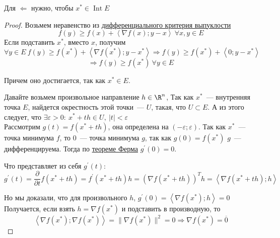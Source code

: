 

\begin{remark}
  Для $\Leftarrow$ нужно, чтобы $x^{*} \in \operatorname{Int} E$
\end{remark}

\begin{proof}
  \proofpart{$\Rightarrow$}
  Возьмем неравенство из \hyperref[note:18BD8497-CEBD-4962-8144-474B489606C3]{дифференциального критерия выпуклости}
  \[
  f(y) \ge f(x) + \left\langle \nabla f(x); y-x \right\rangle\ \forall x, y \in E
  \]
  Если подставить $x^{*}$, вместо $x$, получим
  \[
  \forall y \in E\ f(y) \ge f(x^{*}) + \left\langle \nabla f(x^{*}); y - x^{*} \right\rangle
  \Rightarrow f(y) \ge f(x^{*}) + \left\langle 0; y-x^{*} \right\rangle
  \]
  \[
  \Rightarrow f(y) \ge f(x^{*})\ \forall y \in E
  \]

  Причем оно достигается, так как $x^{*} \in E$.

  \proofpart{$\Leftarrow$}
  Давайте возьмем произвольное направление $h\in \R^n$,
  Так как $x^{*}$~--- внутренняя точка $E$,  найдется окрестность этой точки~--- $U$, такая, что $U \subset E$.
  А из этого следует, что $\exists \varepsilon >0:\ x^{*} + th \in U,\ |t| < \varepsilon$ \\
  Рассмотрим $g(t) = f(x^{*} + th)$, она определена на $(-\varepsilon; \varepsilon)$.
  Так как $x^{*}$~--- точка минимума $f$, то $0$~--- точка минимума $g$, так как $g(0) = f(x^{*})$
  $g$~--- дифференцируема. Тогда по \hyperref[note:1E03F05F-22CC-4D55-BCF1-EBB5774765F0]{теореме Ферма} $g^{\prime}(0) = 0$.

  Что представляет из себя $g^{\prime}(t)$:
  \[
  g^{\prime}(t) = \frac{\partial }{\partial t} f (x^{*} + th) = f^{\prime}(x^{*} + th) h = (\nabla f( x^{*} + th))^T h = \left\langle
  \nabla f(x^{*} +th); h
  \right\rangle
  \]

  Но мы доказали, что для произвольного  $h$, $g^{\prime}(0) = \left\langle \nabla f (x^{*}); h \right\rangle = 0$ \\
  Получается, если взять $h = \nabla f(x^{*})$ и подставить в производную, то
  \[
  \left\langle \nabla f(x^{*}) ; \nabla f(x^{*}) \right\rangle = \| \nabla f (x^{*}) \| ^2 = 0 \Rightarrow \nabla f(x^{*}) = \overline{0}
  \]
\end{proof}
